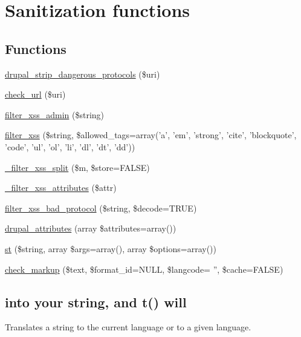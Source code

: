 \hypertarget{group__sanitization}{
\section{Sanitization functions}
\label{group__sanitization}
}
\subsection*{Functions}
\begin{DoxyCompactItemize}
\item 
\hyperlink{group__sanitization_ga46ff2822d576a77317f9045d65317b4f}{drupal\_\-strip\_\-dangerous\_\-protocols} (\$uri)
\item 
\hyperlink{group__sanitization_gac024315b69035ef05c33674838707919}{check\_\-url} (\$uri)
\item 
\hyperlink{group__sanitization_ga97dcceb77b76539219af2a85eacbe18d}{filter\_\-xss\_\-admin} (\$string)
\item 
\hyperlink{group__sanitization_ga8864a29ffa8de5c9f8dc9e417060660d}{filter\_\-xss} (\$string, \$allowed\_\-tags=array('a', 'em', 'strong', 'cite', 'blockquote', 'code', 'ul', 'ol', 'li', 'dl', 'dt', 'dd'))
\item 
\hyperlink{group__sanitization_ga1cc6cca885f021adcf11970b8ec4c846}{\_\-filter\_\-xss\_\-split} (\$m, \$store=FALSE)
\item 
\hyperlink{group__sanitization_ga3c24df8bdf07aa972dd82aa2ab35858f}{\_\-filter\_\-xss\_\-attributes} (\$attr)
\item 
\hyperlink{group__sanitization_ga81affabdadf9d999874d5a69316ec8c8}{filter\_\-xss\_\-bad\_\-protocol} (\$string, \$decode=TRUE)
\item 
\hyperlink{group__sanitization_gacf11629fb3d1ebf200863e2d15380b4a}{drupal\_\-attributes} (array \$attributes=array())
\item 
\hyperlink{group__sanitization_gabc78d1b88aa8081093abbbf71a516c7c}{st} (\$string, array \$args=array(), array \$options=array())
\item 
\hyperlink{group__sanitization_gaa3872d938cf9ba93ed0621a6b26eaa59}{check\_\-markup} (\$text, \$format\_\-id=NULL, \$langcode= '', \$cache=FALSE)
\end{DoxyCompactItemize}
\subsection*{into your string, and t() will}
\label{_amgrpc24520cd0c9d113d5113bfec581ba6b9}
 Translates a string to the current language or to a given language.

